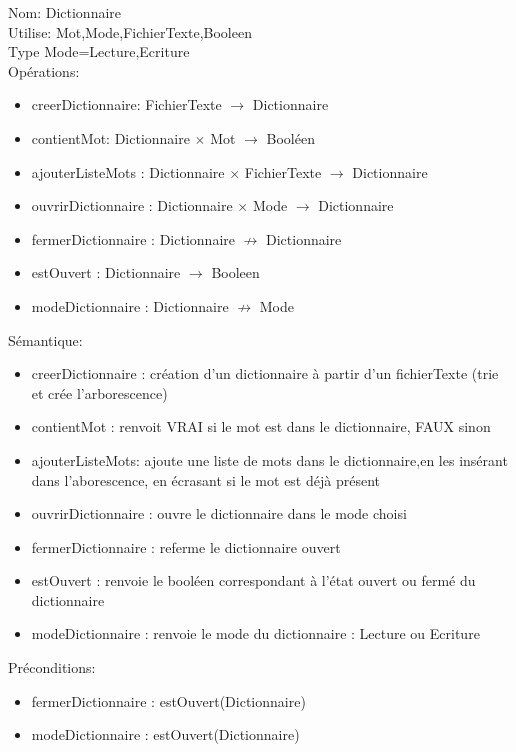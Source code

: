 \documentclass{article}
\begin{document}
    \noindent
    Nom: Dictionnaire \\
    Utilise: Mot,Mode,FichierTexte,Booleen \\
    Type Mode={Lecture,Ecriture} \\
    Opérations: \begin{itemize}[label=$\ $, leftmargin=2cm, itemsep=0cm]
        \item creerDictionnaire: FichierTexte $\rightarrow $ Dictionnaire
        \item contientMot: Dictionnaire $\times$ Mot $\rightarrow $ Booléen
        \item ajouterListeMots : Dictionnaire $\times$ FichierTexte $ \rightarrow$ Dictionnaire
        \item ouvrirDictionnaire : Dictionnaire $\times$ Mode $ \rightarrow$ Dictionnaire
        \item fermerDictionnaire : Dictionnaire $ \nrightarrow$ Dictionnaire
        \item estOuvert : Dictionnaire $ \rightarrow$ Booleen
        \item modeDictionnaire : Dictionnaire $ \nrightarrow$ Mode
        
        
    \end{itemize}
    
    Sémantique: \begin{itemize}[label=$\- $, leftmargin=2cm, itemsep=0cm]
        \item creerDictionnaire : création d’un dictionnaire à partir d’un fichierTexte (trie et crée l'arborescence)
        \item contientMot : renvoit VRAI si le mot est dans le dictionnaire, FAUX sinon
        \item ajouterListeMots: ajoute une liste de mots dans le dictionnaire,en les insérant dans l'aborescence, en écrasant si le mot est déjà présent
        \item ouvrirDictionnaire : ouvre le dictionnaire dans le mode choisi
        \item fermerDictionnaire : referme le dictionnaire ouvert
        \item estOuvert : renvoie le booléen correspondant à l'état ouvert ou fermé du dictionnaire
        \item modeDictionnaire : renvoie le mode du dictionnaire : Lecture ou Ecriture
    \end{itemize}

    Préconditions: \begin{itemize}[label=$\- $, leftmargin=2cm, itemsep=0cm]
        \item fermerDictionnaire : estOuvert(Dictionnaire)
        \item modeDictionnaire : estOuvert(Dictionnaire)
    \end{itemize}
\end{document}
